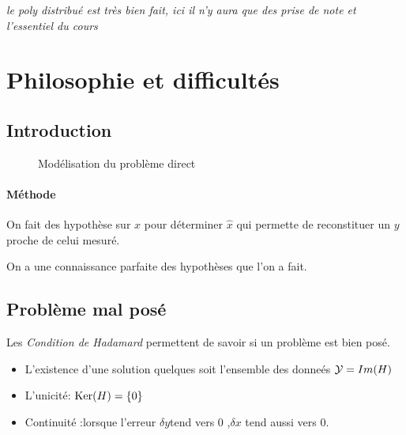 \documentclass[main.tex]{subfiles}
\begin{document}
\emph{le poly distribué est très bien fait, ici il n'y aura que des prise de note et l'essentiel du cours}
\section{Philosophie et difficultés}
\subsection{Introduction}

\begin{figure}[H]
  \centering
  \caption{Modélisation du problème direct}
\end{figure}

\paragraph{Méthode}
On fait des hypothèse sur $x$ pour déterminer $\hat{x}$ qui permette de reconstituer un $y$ proche de celui mesuré.

On a une connaissance parfaite des hypothèses que l'on a fait.

\subsection{Problème mal posé}
\begin{defin}
  Les \emph{Condition de Hadamard} permettent de savoir si un problème est bien posé.
  \begin{itemize}
  \item L'existence d'une solution quelques soit l'ensemble des donneés ${\cal Y} = Im(H)$
  \item L'unicité: $\text{Ker}(H)=\{0\}$
  \item Continuité :lorsque l'erreur $\delta y $tend vers 0 ,$\delta x $ tend aussi vers 0.
  \end{itemize}
\end{defin}
\end{document}
